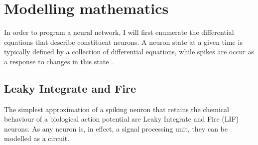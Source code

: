\section{Modelling mathematics}

In order to program a neural network, I will first enumerate the differential
equations that describe constituent neurons. A neuron state at a given time is
typically defined by a collection of differential equations, while spikes are
occur as a response to changes in this state
\autocite{brette_simulation_2007}.


\subsection{Leaky Integrate and Fire}

The simplest approximation of a spiking neuron that retains the chemical
behaviour of a biological action potential are Leaky Integrate and Fire (LIF) neurons. As any neuron is, in effect, a
signal processing unit, they can be modelled as a circuit.

